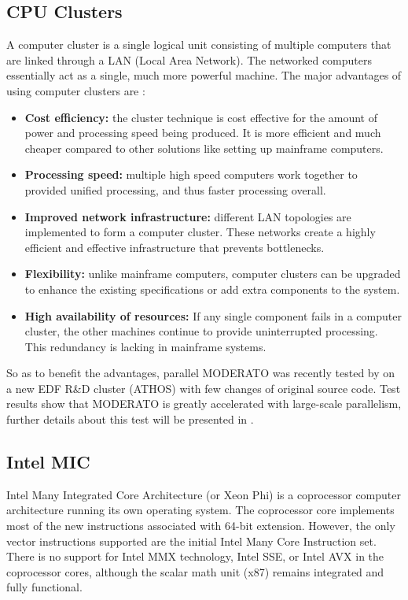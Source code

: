
\subsection{CPU Clusters}
A computer cluster is a single logical unit consisting of multiple computers that are linked through a LAN (Local Area Network). The networked computers essentially act as a single, much more powerful machine. The major advantages of using computer clusters are \citep{cluster}:
\begin{itemize}
\it
{} %
\item \textbf{Cost efficiency: }the cluster technique is cost effective for the amount of power and processing speed being produced. It is more efficient and much cheaper compared to other solutions like setting up mainframe computers.
\item \textbf{Processing speed: }multiple high speed computers work together to provided unified processing, and thus faster processing overall. 
\item \textbf{Improved network infrastructure: }different LAN topologies are implemented to form a computer cluster. These networks create a highly efficient and effective infrastructure that prevents bottlenecks. 
\item \textbf{Flexibility: }unlike mainframe computers, computer clusters can be upgraded to enhance the existing specifications or add extra components to the system. 
\item \textbf{High availability of resources: }If any single component fails in a computer cluster, the other machines continue to provide uninterrupted processing. This redundancy is lacking in mainframe systems.
\end{itemize}
So as to benefit the advantages, parallel MODERATO was recently tested by {\supname} on a new EDF R\&D cluster (ATHOS) with few changes of original source code. Test results show that MODERATO is greatly accelerated with large-scale parallelism, further details about this test will be presented in .
\subsection{Intel MIC}
Intel Many Integrated Core Architecture (or Xeon Phi) is a coprocessor computer architecture running its own operating system. The coprocessor core implements most of the new instructions associated with 64-bit extension. However, the only vector instructions supported are the initial Intel Many Core Instruction set. There is no support for Intel MMX technology, Intel SSE, or Intel AVX in the coprocessor cores, although the scalar math unit (x87) remains integrated and fully functional.

